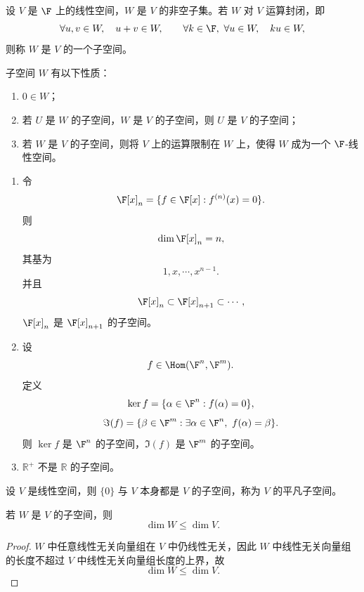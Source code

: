 \begin{definition}[子空间]\label{p1:concept:c4-l585}
	设 $V$ 是 $\F$ 上的线性空间，$W$ 是 $V$ 的非空子集。若 $W$ 对 $V$ 运算封闭，即
	\[
	\forall u,v\in W,\quad u+v\in W,
	\qquad
	\forall k\in\F,\ \forall u\in W,\quad ku\in W,
	\]
	则称 $W$ 是 $V$ 的一个子空间。
	

\end{definition}
	子空间 $W$ 有以下性质：
\begin{enumerate}
	\item $0\in W$；
	\item 若 $U$ 是 $W$ 的子空间，$W$ 是 $V$ 的子空间，则 $U$ 是 $V$ 的子空间；
	\item 若 $W$ 是 $V$ 的子空间，则将 $V$ 上的运算限制在 $W$ 上，使得 $W$ 成为一个 $\F$-线性空间。
\end{enumerate}
\begin{example}
	\begin{enumerate}
		\item 令
		\[
		\F[x]_n=\{f\in\F[x]:f^{(n)}(x)=0\}.
		\]
		则
		\[
		\dim\F[x]_n=n,
		\]
		其基为
		\[
		1,x,\cdots,x^{n-1}.
		\]
		并且
		\[
		\F[x]_n\subset \F[x]_{n+1}\subset\cdots,
		\]
		$\F[x]_n$ 是 $\F[x]_{n+1}$ 的子空间。
		
		\item 设
		\[
		f\in\Hom(\F^n,\F^m).
		\]
		定义
		\[
		\ker f=\{\alpha\in\F^n:f(\alpha)=0\},
		\]
		\[
		\Im(f)=\{\beta\in\F^m:\exists \alpha\in\F^n,\ f(\alpha)=\beta\}.
		\]
		则 $\ker f$ 是 $\F^n$ 的子空间，$\Im(f)$ 是 $\F^m$ 的子空间。
		
		\item $\mathbb{R}^{+}$ 不是 $\mathbb{R}$ 的子空间。
	\end{enumerate}
\end{example}

\begin{definition}[平凡子空间]\label{p1:concept:c4-l639}
	设 $V$ 是线性空间，则 $\{0\}$ 与 $V$ 本身都是 $V$ 的子空间，称为 $V$ 的平凡子空间。
\end{definition}

\begin{lemma}
	若 $W$ 是 $V$ 的子空间，则
	\[
	\dim W\leq \dim V.
	\]
\end{lemma}

\begin{proof}
	$W$ 中任意线性无关向量组在 $V$ 中仍线性无关，因此 $W$ 中线性无关向量组的长度不超过 $V$ 中线性无关向量组长度的上界，故
	\[
	\dim W\leq \dim V.
	\]
\end{proof}

